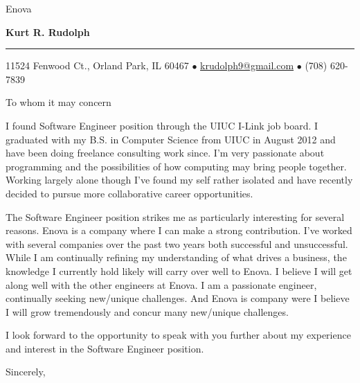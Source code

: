 \documentclass{letter} %
\begin{document}
\signature{Kurt R. Rudolph}           %
\longindentation=0pt                       %
\let\raggedleft\raggedright                %
 
 
\begin{letter}{
Enova}

\begin{center}
{\large\bf Kurt R. Rudolph} 
\end{center}
\medskip\hrule height 1pt
\begin{center}
{11524 Fenwood Ct., Orland Park, IL 60467 \(\bullet\) \href{mailto:krudolph9@gmail.com}{krudolph9@gmail.com} \(\bullet\) (708) 620-7839 }
\end{center} \vfill %
 
\opening{To whom it may concern} 
 
\noindent I found Software Engineer position through the UIUC I-Link job board.
I graduated with my B.S. in Computer Science from UIUC in August 2012 
and have been doing freelance consulting work since.  I'm very 
passionate about programming and the possibilities of how computing 
may bring people together. Working largely alone though I've found 
my self rather isolated and have recently decided to pursue more 
collaborative career opportunities.
 
\noindent The Software Engineer position strikes me as particularly interesting for several reasons.  
Enova is a company where I can make a strong contribution.  I've worked with several companies 
over the past two years both successful and unsuccessful. While I am continually refining my understanding of what drives a business, the knowledge I currently hold likely will carry over well to Enova.
I believe I will get along well with the other engineers at Enova.
I am a passionate engineer, continually seeking new/unique challenges.  
And Enova is company were I believe I will grow tremendously and 
concur many new/unique challenges.


 
\noindent I look forward to the opportunity 
to speak with you further about my experience 
and interest in the Software Engineer position.
 
 
\closing{Sincerely,} 
 

 

\end{letter}
 
\end{document}

